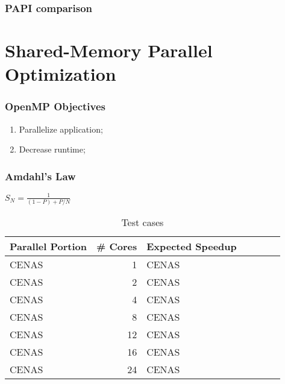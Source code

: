 \documentclass{beamer}
\begin{document}
\begin{frame}
	\frametitle{PAPI comparison}
	\begin{figure}[!htp]
	\label{fig:original_papi}
	\end{figure}
	\begin{figure}[!htp]
	\label{fig:optm_papi}
	\end{figure}
\end{frame}


\section{Shared-Memory Parallel Optimization}
\begin{frame}
	\frametitle{OpenMP Objectives}
	\begin{enumerate}
		\item Parallelize application;
		\item Decrease runtime;
	\end{enumerate}
\end{frame}	


\begin{frame}
	\frametitle{Amdahl's Law}
	\begin{description}
		
		$S_{N}=\frac{1}{(1-P) + P/N}$

		\begin{center}
			\begin{table}[!htp]
			\begin{tabular}{lrlrlrl}
			\hline
			\textbf{Parallel Portion} & \textbf{\# Cores} & \textbf{Expected Speedup}\\
			\hline
			CENAS & 1 & CENAS \\
			CENAS & 2 & CENAS \\
			CENAS & 4 & CENAS \\
			CENAS & 8 & CENAS \\
			CENAS & 12 & CENAS \\
			CENAS & 16 & CENAS \\
			CENAS & 24 & CENAS \\
			\hline
			\end{tabular}
			\caption{Test cases}
			\label{tab:testcases}
			\end{table}
		\end{center}	
	\end{description}
\end{frame}
\end{document}
